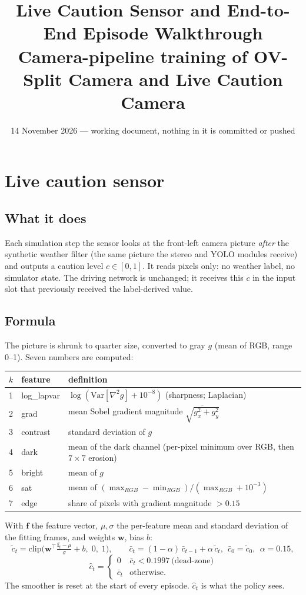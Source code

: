 \documentclass[11pt,a4paper]{article}
\title{Live Caution Sensor and End-to-End Episode Walkthrough\\\large Camera-pipeline training of OV-Split Camera and Live Caution Camera}
\date{14 November 2026 --- working document, nothing in it is committed or pushed}
\author{}
\begin{document}
\maketitle
\tableofcontents

\section{Live caution sensor}
\subsection{What it does}
Each simulation step the sensor looks at the front-left camera picture \emph{after} the synthetic weather filter (the same picture the stereo and YOLO modules receive) and outputs a caution level $c\in[0,1]$. It reads pixels only: no weather label, no simulator state. The driving network is unchanged; it receives this $c$ in the input slot that previously received the label-derived value.

\subsection{Formula}
The picture is shrunk to quarter size, converted to gray $g$ (mean of RGB, range 0--1). Seven numbers are computed:
\begin{center}\small\begin{tabular}{@{}llp{8.2cm}@{}}\toprule
$k$ & feature & definition\\\midrule
1 & log\_lapvar & $\log(\mathrm{Var}[\nabla^2 g]+10^{-8})$ (sharpness; Laplacian)\\
2 & grad & mean Sobel gradient magnitude $\overline{\sqrt{g_x^2+g_y^2}}$\\
3 & contrast & standard deviation of $g$\\
4 & dark & mean of the dark channel (per-pixel minimum over RGB, then $7{\times}7$ erosion)\\
5 & bright & mean of $g$\\
6 & sat & mean of $(\max_{RGB}-\min_{RGB})/(\max_{RGB}+10^{-3})$\\
7 & edge & share of pixels with gradient magnitude $>0.15$\\\bottomrule\end{tabular}\end{center}
With $\mathbf{f}$ the feature vector, $\mu,\sigma$ the per-feature mean and standard deviation of the fitting frames, and weights $\mathbf{w}$, bias $b$:
\[
\tilde c_t=\mathrm{clip}\!\Big(\mathbf{w}^{\top}\tfrac{\mathbf f_t-\mu}{\sigma}+b,\;0,\;1\Big),\qquad
\bar c_t=(1-\alpha)\,\bar c_{t-1}+\alpha\,\tilde c_t,\ \ \bar c_0=\tilde c_0,\ \ \alpha=0.15,
\]
\[
\hat c_t=\begin{cases}0&\bar c_t<0.1997\ \text{(dead-zone)}\\ \bar c_t&\text{otherwise.}\end{cases}
\]
The smoother is reset at the start of every episode. $\hat c_t$ is what the policy sees.
\end{document}
